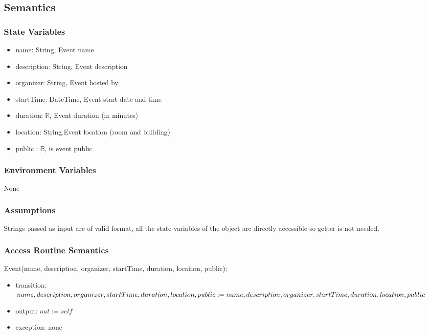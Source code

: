 \documentclass[12pt, titlepage]{article}
\begin{document}
\subsection{Semantics}

\subsubsection{State Variables}

\begin{itemize}
\item name: String, Event name
\item description: String, Event description
\item organizer: String, Event hosted by
\item startTime: DateTime, Event start date and time
\item duration: $\mathbb{R}$, Event duration (in minutes)
\item location: String,Event location (room and building)
\item public : $\mathbb{B}$, is event public
\end{itemize}

\subsubsection{Environment Variables}

None

\subsubsection{Assumptions}

Strings passed as input are of valid format, all the state variables of the object are directly accessible so getter is not needed.

\subsubsection{Access Routine Semantics}

\noindent Event(name, description, organizer, startTime, duration, location, public):
\begin{itemize}
\item transition: $name, description, organizer, startTime, duration, location, public := \\ name, description, organizer, startTime, duration, location, public$
\item output: $out := self$
\item exception: none
\end{itemize}
\end{document}
